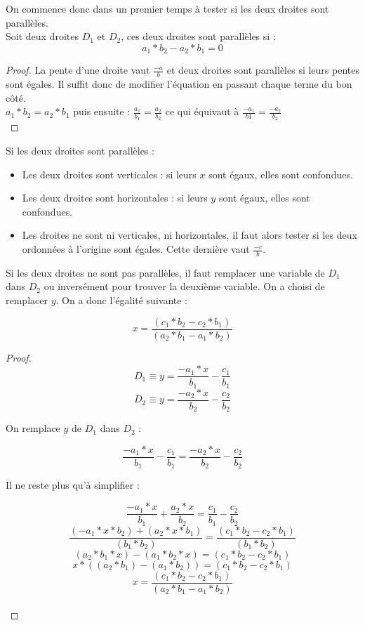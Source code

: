 \documentclass[]{report}
\begin{document}
On commence donc dans un premier temps à tester si les deux droites sont parallèles. \\

Soit deux droites $D_1$ et $D_2$, ces deux droites sont parallèles si : 
$$ a_1 * b_2 - a_2 * b_1 = 0 $$

\begin{proof}
La pente d'une droite vaut $\frac{-a}{b}$ et deux droites sont parallèles
si leurs pentes sont égales. Il suffit donc de modifier l'équation en passant chaque terme du bon côté. \\
$ a_1 * b_2 = a_2 * b_1 $ puis ensuite : $ \frac{a_1}{b_1} = \frac{a_2}{b_2} $ ce qui équivaut à
$ \frac{-a_1}{b1} = \frac{-a_2}{b_2} $ \\
\end{proof}

Si les deux droites sont parallèles : 
\begin{itemize}
    \item Les deux droites sont verticales : si leurs $x$ sont égaux, elles sont confondues.
    \item Les deux droites sont horizontales : si leurs $y$ sont égaux, elles sont confondues.
    \item Les droites ne sont ni verticales, ni horizontales, il faut alors tester si les deux
        ordonnées à l'origine sont égales. Cette dernière vaut $\frac{-c}{b}$. \\
\end{itemize}

Si les deux droites ne sont pas parallèles, il faut remplacer une variable de $D_1$ dans $D_2$
ou inversément pour trouver la deuxième variable. On a choisi de remplacer $y$.
On a donc l'égalité suivante : 

$$ x = \frac{(c_1 * b_2 - c_2 * b_1)}{(a_2 * b_1 - a_1 * b_2)} $$

\begin{proof}
$$ D_1 \equiv y = \frac{-a_1 * x}{b_1} - \frac{c_1}{b_1} $$
$$ D_2 \equiv y = \frac{-a_2 * x}{b_2} - \frac{c_2}{b_2} $$

On remplace $y$ de $D_1$ dans $D_2$ :

$$ \frac{-a_1 * x}{b_1} - \frac{c_1}{b_1} = \frac{-a_2 * x}{b_2} - \frac{c_2}{b_2} $$

Il ne reste plus qu'à simplifier :

$$ \frac{-a_1 * x}{b_1} + \frac{a_2 * x}{b_2} = \frac{c_1}{b_1} - \frac{c_2}{b_2} $$
$$ \frac{(-a_1 * x * b_2) + (a_2 * x * b_1)}{(b_1 * b_2)} = \frac{(c_1 * b_2 - c_2 * b_1)}{(b_1 * b_2)} $$
$$ (a_2 * b_1 * x) - (a_1 * b_2 * x) = (c_1 * b_2 - c_2 * b_1) $$
$$ x * ((a_2 * b_1) - (a_1 * b_2)) = (c_1 * b_2 - c_2 * b_1) $$
$$ x = \frac{(c_1 * b_2 - c_2 * b_1)}{(a_2 * b_1 - a_1 * b_2)} $$ \\
\end{proof}
\end{document}

